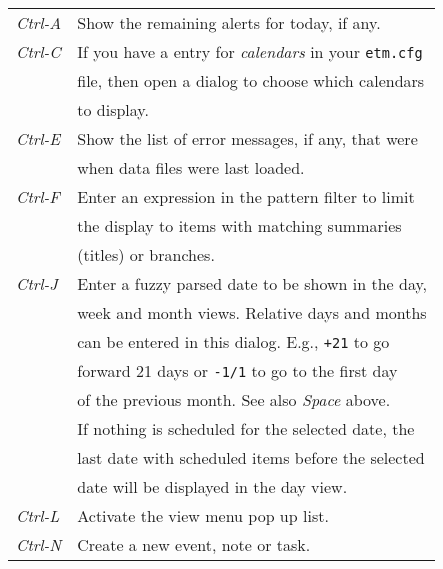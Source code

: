 \documentclass[10pt,landscape]{article}
\begin{document}
\begin{multicols}{3}
\begin{tabular}{@{}ll@{}}
\emph{Ctrl-A}        & Show the remaining alerts for today, if any. \\
\emph{Ctrl-C}        & If you have a entry for \emph{calendars} in your \verb!etm.cfg! \\
                        & file, then open a dialog to choose which calendars \\
                        & to display. \\
\emph{Ctrl-E}        & Show the list of error messages, if any, that were \\
                        & when data files were last loaded.  \\
\emph{Ctrl-F}        & Enter an expression in the pattern filter to limit \\
                        & the display to items with matching summaries  \\
                        & (titles) or branches. \\
\emph{Ctrl-J}        & Enter a fuzzy parsed date to be shown in the day, \\
                        & week and month views. Relative days and months \\
                        & can be entered in this dialog. E.g., \verb'+21' to go \\
                        & forward 21 days or \verb'-1/1' to go to the first day \\
                        & of the previous month. See also \emph{Space} above. \\
                        & If nothing is scheduled for the selected date, the \\
                        & last date with scheduled items before the selected \\
                        & date will be displayed in the day view. \\
\emph{Ctrl-L}        & Activate the view menu pop up list. \\
\emph{Ctrl-N}        & Create a new event, note or task. \\
\end{tabular}
\begin{tabular}{@{}ll@{}}


\end{tabular}
\end{multicols}
\end{document}
